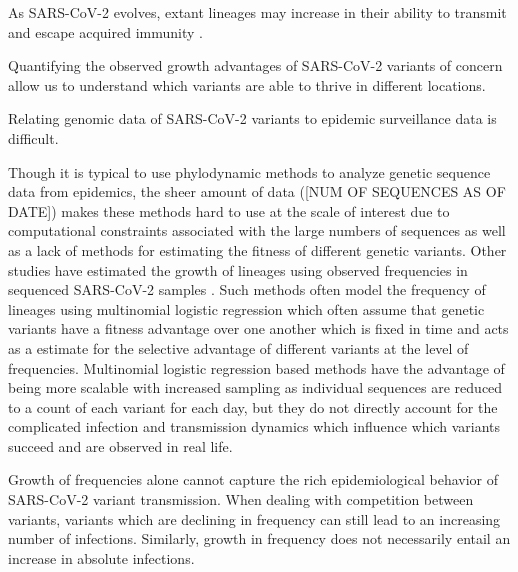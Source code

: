 \documentclass[11pt,oneside,letterpaper]{article}
\begin{document}
As SARS-CoV-2 evolves, extant lineages may increase in their ability to transmit and escape acquired immunity \cite{Tegally2020}. %

Quantifying the observed growth advantages of SARS-CoV-2 variants of concern allow us to understand which variants are able to thrive in different locations.



Relating genomic data of SARS-CoV-2 variants to epidemic surveillance data is difficult.


Though it is typical to use phylodynamic methods to analyze genetic sequence data from epidemics, the sheer amount of data ([NUM OF SEQUENCES AS OF DATE]) makes these methods hard to use at the scale of interest due to computational constraints associated with the large numbers of sequences as well as a lack of methods for estimating the fitness of different genetic variants. 
Other studies have estimated the growth of lineages using observed frequencies in sequenced SARS-CoV-2 samples \cites{Annavajhala2021, Faria2021, Obermeyer2021, Ito2021}. %
Such methods often model the frequency of lineages using multinomial logistic regression \cites{Ito2021, Obermeyer2021} which often assume that genetic variants have a fitness advantage over one another which is fixed in time and acts as a estimate for the selective advantage of different variants at the level of frequencies.
Multinomial logistic regression based methods have the advantage of being more scalable with increased sampling as individual sequences are reduced to a count of each variant for each day, but they do not directly account for the complicated infection and transmission dynamics which influence which variants succeed and are observed in real life.

Growth of frequencies alone cannot capture the rich epidemiological behavior of SARS-CoV-2 variant transmission.
When dealing with competition between variants, variants which are declining in frequency can still lead to an increasing number of infections.
Similarly, growth in frequency does not necessarily entail an increase in absolute infections.
\end{document}
